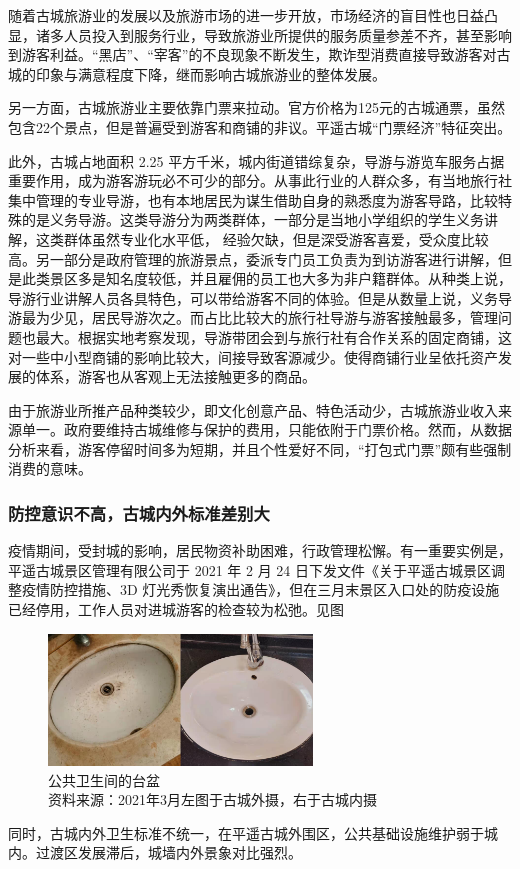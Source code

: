 \documentclass[UTF8]{ctexart}
\begin{document}
        随着古城旅游业的发展以及旅游市场的进一步开放，市场经济的盲目性也日益凸显，诸多人员投入到服务行业，导致旅游业所提供的服务质量参差不齐，甚至影响到游客利益。“黑店”、“宰客”的不良现象不断发生，欺诈型消费直接导致游客对古城的印象与满意程度下降，继而影响古城旅游业的整体发展。
        
        另一方面，古城旅游业主要依靠门票来拉动。官方价格为125元的古城通票，虽然包含22个景点，但是普遍受到游客和商铺的非议。平遥古城“门票经济”特征突出。
        
        此外，古城占地面积 2.25 平方千米，城内街道错综复杂，导游与游览车服务占据重要作用，成为游客游玩必不可少的部分。从事此行业的人群众多，有当地旅行社集中管理的专业导游，也有本地居民为谋生借助自身的熟悉度为游客导路，比较特殊的是义务导游。这类导游分为两类群体，一部分是当地小学组织的学生义务讲解，这类群体虽然专业化水平低， 经验欠缺，但是深受游客喜爱，受众度比较高。另一部分是政府管理的旅游景点，委派专门员工负责为到访游客进行讲解，但是此类景区多是知名度较低，并且雇佣的员工也大多为非户籍群体。从种类上说，导游行业讲解人员各具特色，可以带给游客不同的体验。但是从数量上说，义务导游最为少见，居民导游次之。而占比比较大的旅行社导游与游客接触最多，管理问题也最大。根据实地考察发现，导游带团会到与旅行社有合作关系的固定商铺，这对一些中小型商铺的影响比较大，间接导致客源减少。使得商铺行业呈依托资产发展的体系，游客也从客观上无法接触更多的商品。
        
        由于旅游业所推产品种类较少，即文化创意产品、特色活动少，古城旅游业收入来源单一。政府要维持古城维修与保护的费用，只能依附于门票价格。然而，从数据分析来看，游客停留时间多为短期，并且个性爱好不同，“打包式门票”颇有些强制消费的意味。
        
        \subsubsection{防控意识不高，古城内外标准差别大}
        疫情期间，受封城的影响，居民物资补助困难，行政管理松懈。有一重要实例是，平遥古城景区管理有限公司于 2021 年 2 月 24 日下发文件《关于平遥古城景区调整疫情防控措施、3D 灯光秀恢复演出通告》，但在三月末景区入口处的防疫设施已经停用，工作人员对进城游客的检查较为松弛。见图
        \begin{figure}[H]
        \centering
        \includegraphics[width=7cm]{洗脸盆.jpg}
        \caption[plain]{公共卫生间的台盆\\资料来源：2021年3月左图于古城外摄，右于古城内摄}
        \label{fig:my_label}
        \end{figure}
        同时，古城内外卫生标准不统一，在平遥古城外围区，公共基础设施维护弱于城内。过渡区发展滞后，城墙内外景象对比强烈。
        
\end{document}
